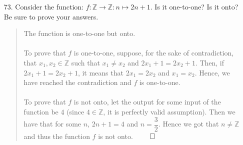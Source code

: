 \documentclass[12pt, a4paper]{article}
\newcommand{\ints}{\mathbb{Z}}
\newcommand\und[1]{\underline{\smash{#1}}}
\begin{document}
\begin{itemize}
\item[73.]
Consider the function: $f : \ints \rightarrow \ints : n \mapsto 2n + 1$. Is it one-to-one? Is it onto?
Be sure to prove your answers.
\begin{quote}
The function is one-to-one but \und{NOT} onto.
\\\\
To prove that $f$ is one-to-one, suppose, for the sake of contradiction, that $x_1, x_2 \in \ints$ such that $x_1 \neq x_2$
and $2x_1 + 1 = 2x_2 + 1$. Then, if $2x_1 + 1 = 2x_2 + 1$, it means that $2x_1 = 2x_2$ and $x_1 = x_2$. Hence, we have reached
the contradiction and $f$ is one-to-one.
\\\\
To prove that $f$ is not onto, let the output for some input of the function be $4$ (since $4 \in \ints$, it is perfectly valid assumption).
Then we have that for some $n$, $2n + 1 = 4$
and $n = \dfrac{3}{2}$. Hence we got that $n \neq \mathbb{Z}$ and thus the function $f$ is not onto.
$\qed$
\end{quote}


\end{itemize}
\end{document}
